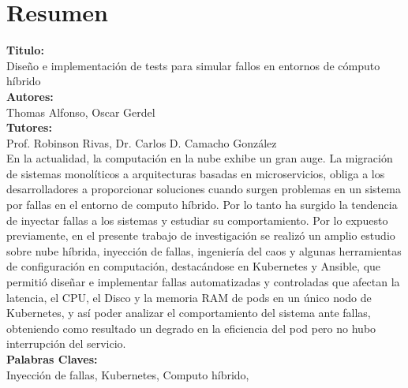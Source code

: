\chapter*{Resumen}



\noindent \textbf{Titulo:}\\ 
Diseño e implementación de tests para simular fallos en entornos de cómputo híbrido \\
\noindent \textbf{Autores:}\\
Thomas Alfonso, Oscar Gerdel \\ 
\noindent \textbf{Tutores:}\\
Prof. Robinson Rivas, Dr. Carlos D. Camacho González\\

En la actualidad, la computación en la nube exhibe un gran auge. La migración de sistemas monolíticos a arquitecturas basadas en microservicios, obliga a los desarrolladores a proporcionar soluciones cuando surgen problemas en un sistema por fallas en el entorno de computo híbrido. Por lo tanto ha surgido la
 tendencia de inyectar fallas a los sistemas y estudiar su comportamiento. Por lo expuesto previamente, en el presente trabajo de investigación se realizó un amplio estudio sobre nube híbrida, inyección de fallas, ingeniería del caos y algunas herramientas de configuración en computación, destacándose en Kubernetes y Ansible, 
 que permitió diseñar e implementar fallas automatizadas y controladas que afectan la latencia, el CPU, el Disco y la memoria RAM de pods en un único nodo de Kubernetes, y así poder analizar el comportamiento del sistema ante fallas, obteniendo como resultado un degrado en la eficiencia del pod pero no hubo interrupción del servicio.\\    


\noindent \textbf{Palabras Claves:}\\ 
Inyección de fallas, Kubernetes, Computo híbrido,